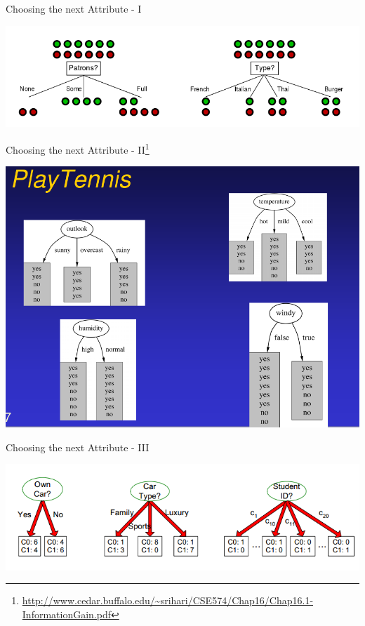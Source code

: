 \documentclass{beamer}
\newcommand{\furl}[1]{{\footnote{\url{#1}}}}
\begin{document}
\begin{frame}{Choosing the next Attribute - I}
    \begin{center}
        \includegraphics[scale=0.4]{choosingNextAttr1.png}
    \end{center}
\end{frame}
\begin{frame}{Choosing the next Attribute - II\furl{http://www.cedar.buffalo.edu/~srihari/CSE574/Chap16/Chap16.1-InformationGain.pdf}}
    \begin{center}
        \includegraphics[scale=0.3]{choosingNextAttr2.png}
    \end{center}
\end{frame}
\begin{frame}{Choosing the next Attribute - III}
    \begin{center}
        \includegraphics[scale=0.45]{choosingNextAttr3.png}
    \end{center}
\end{frame}
\end{document}
